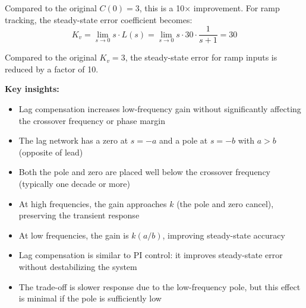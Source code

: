 \documentclass[11pt,a4paper]{article}
\begin{document}
Compared to the original $C(0) = 3$, this is a 10× improvement. For ramp tracking, the steady-state error coefficient becomes:
\begin{equation}
  K_v = \lim_{s \to 0} s \cdot L(s) = \lim_{s \to 0} s \cdot 30 \cdot \frac{1}{s+1} = 30
\end{equation}

Compared to the original $K_v = 3$, the steady-state error for ramp inputs is reduced by a factor of 10.

\textbf{Key insights:}
\begin{itemize}
  \item Lag compensation increases low-frequency gain without significantly affecting the crossover frequency or phase margin
  \item The lag network has a zero at $s = -a$ and a pole at $s = -b$ with $a > b$ (opposite of lead)
  \item Both the pole and zero are placed well below the crossover frequency (typically one decade or more)
  \item At high frequencies, the gain approaches $k$ (the pole and zero cancel), preserving the transient response
  \item At low frequencies, the gain is $k(a/b)$, improving steady-state accuracy
  \item Lag compensation is similar to PI control: it improves steady-state error without destabilizing the system
  \item The trade-off is slower response due to the low-frequency pole, but this effect is minimal if the pole is sufficiently low
\end{itemize}
\end{document}
